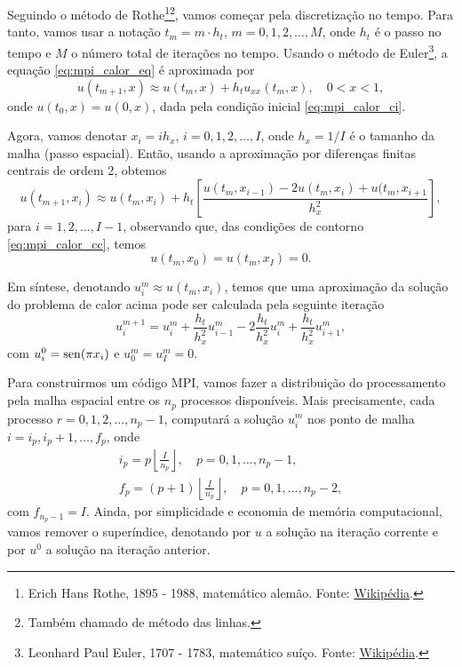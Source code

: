 Seguindo o método de Rothe\footnote{Erich Hans Rothe, 1895 - 1988, matemático alemão. Fonte: \href{https://pt.wikipedia.org/wiki/Erich_Rothe}{Wikipédia}.}\footnote{Também chamado de método das linhas.}, vamos começar pela discretização no tempo. Para tanto, vamos usar a notação $t_m = m\cdot h_t$, $m=0,1,2,\dotsc,M$, onde $h_t$ é o passo no tempo e $M$ o número total de iterações no tempo. Usando o método de Euler\footnote{Leonhard Paul Euler, 1707 - 1783, matemático suíço. Fonte: \href{https://pt.wikipedia.org/wiki/Leonhard_Euler}{Wikipédia}.}, a equação \eqref{eq:mpi_calor_eq} é aproximada por
\begin{equation}\label{eq:mpi_color_eq_euler}
  u(t_{m+1}, x) \approx u(t_m, x) + h_t u_{xx}(t_m, x),\quad 0<x<1,
\end{equation}
onde $u(t_0, x) = u(0, x)$, dada pela condição inicial \eqref{eq:mpi_calor_ci}.

Agora, vamos denotar $x_i=ih_x$, $i=0,1,2,\dotsc,I$, onde $h_x=1/I$ é o tamanho da malha (passo espacial). Então, usando a aproximação por diferenças finitas centrais de ordem 2, obtemos
\begin{equation}
  u(t_{m+1}, x_i) \approx u(t_m, x_i) + h_t \left[\frac{u(t_m,x_{i-1}) - 2u(t_m, x_i) + u(t_m, x_{i+1}}{h_x^2}\right],
\end{equation}
para $i=1,2,\dotsc,I-1$, observando que, das condições de contorno \eqref{eq:mpi_calor_cc}, temos
\begin{equation}
  u(t_m, x_0) = u(t_m, x_I) = 0.
\end{equation}

Em síntese, denotando $u^m_i \approx u(t_m, x_i)$, temos que uma aproximação da solução do problema de calor acima pode ser calculada pela seguinte iteração
\begin{equation}
  u^{m+1}_i = u^m_i + \frac{h_t}{h_x^2}u^m_{i-1} - 2\frac{h_t}{h_x^2}u^m_{i} + \frac{h_t}{h_x^2}u^m_{i+1},
\end{equation}
com $u^0_i = \operatorname{sen}(\pi x_i)$ e $u^m_0=u^m_I = 0$.

Para construirmos um código MPI, vamos fazer a distribuição do processamento pela malha espacial entre os $n_p$ processos disponíveis. Mais precisamente, cada processo $r = 0, 1, 2, \dotsc, n_p-1$, computará a solução $u^m_i$ nos ponto de malha $i=i_p, i_p+1, \dotsc, f_p$, onde
\begin{gather}
  i_p = p\left\lfloor\frac{I}{n_p}\right\rfloor, \quad p=0,1,\dotsc,n_p-1,\\
  f_p = (p+1)\left\lfloor\frac{I}{n_p}\right\rfloor,\quad p=0,1,\dotsc,n_p-2,
\end{gather}
com $f_{n_p-1}=I$. Ainda, por simplicidade e economia de memória computacional, vamos remover o superíndice, denotando por $u$ a solução na iteração corrente e por $u^0$ a solução na iteração anterior.

